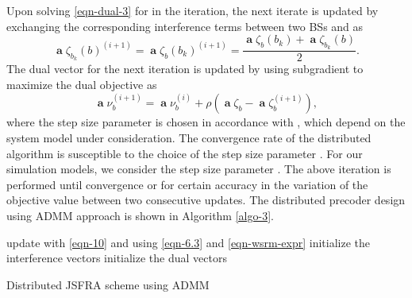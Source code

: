 Upon solving \eqref{eqn-dual-3} for  in the  iteration, the next iterate is updated by exchanging the corresponding interference terms between two \acp{BS}  and  as
\begin{equation}
\mbfa{\zeta}_{b_k}(b)^{(i+1)} = \mbfa{\zeta}_{b}(b_k)^{(i+1)} = \frac{\mbfa{\zeta}_{b}(b_k) + \mbfa{\zeta}_{b_k}(b)}{2}.
\label{if-sg-update}
\end{equation}
The dual vector for the next iteration is updated by using subgradient to maximize the dual objective as
\begin{equation}
\mbfa{\nu}_b^{(i+1)} = \mbfa{\nu}_b^{(i)} + \rho \left (\mbfa{\zeta}_b - \mbfa{\zeta}_b^{(i+1)} \right ),
\label{dual-sg-update}
\end{equation}
where the step size parameter \me{\rho} is chosen in accordance with \cite{boyd2011distributed}, which depend on the system model under consideration. The convergence rate of the distributed algorithm is susceptible to the choice of the step size parameter \me{\rho}. For our simulation models, we consider the step size parameter . The above iteration is performed until convergence or for certain accuracy in the variation of the objective value between two consecutive updates. The distributed precoder design using \ac{ADMM} approach is shown in Algorithm \ref{algo-3}.
{\allowdisplaybreaks 
\begin{algorithm}
	\SetAlgoLined
	\DontPrintSemicolon
	\BlankLine
	update  with \eqref{eqn-10} and  using \eqref{eqn-6.3} and \eqref{eqn-wsrm-expr} \;
	initialize the interference vectors  \;
	initialize the dual vectors  \;
	\caption{Distributed \ac{JSFRA} scheme using \ac{ADMM}}
	\label{algo-3}
\end{algorithm}}

